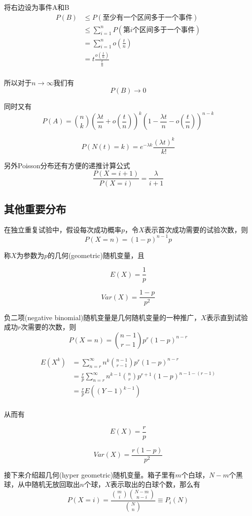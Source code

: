 \documentclass[UTF8]{ctexart}
\begin{document}
将右边设为事件A和B
$$\begin{aligned}
P(B)&\leq P(\text{至少有一个区间多于一个事件})\\
&\leq \sum_{i=1}^{n}P(\text{第}i \text{个区间多于一个事件})\\
&=\sum_{i=1}^{n}o(\frac{t}{n})\\
&=t\frac{o(\frac{t}{n})}{\frac{t}{n}}\\
\end{aligned} $$

所以对于$n\to \infty $我们有
$$P(B)\to 0$$

同时又有
$$P(A)=\binom{n}{k}(\frac{\lambda t}{n}+o(\frac{t}{n}))^{k}(1-\frac{\lambda t}{n}-o(\frac{t}{n}))^{n-k} $$

$$P(N(t)=k)=e^{-\lambda k}\frac{(\lambda t)^{k}}{k!} $$

另外Poisson分布还有方便的递推计算公式
$$\frac{P(X=i+1)}{P(X=i)}=\frac{\lambda }{i+1} $$

\subsection{其他重要分布}

在独立重复试验中，假设每次成功概率$p$，令$X$表示首次成功需要的试验次数，则
$$P(X=n)=(1-p)^{n-1}p$$

称$X$为参数为$p$的几何(geometric)随机变量，且

$$E(X)=\frac{1}{p}$$

$$Var(X)=\frac{1-p}{p^{2}}$$

负二项(negative binomial)随机变量是几何随机变量的一种推广，$X$表示直到试验成功$r$次需要的次数，则
$$P(X=n)=\binom{n-1}{r-1}p^{r}(1-p)^{n-r} $$

$$\begin{aligned}
E(X^{k})&=\sum_{n=r}^{\infty }n^{k}\binom{n-1}{r-1}p^{r}(1-p)^{n-r}\\
&=\frac{r}{p}\sum_{n=r}^{\infty }n^{k-1}\binom{n}{r}p^{r+1}(1-p)^{n-1-(r-1)}\\
&=\frac{r}{p}E((Y-1)^{k-1})\\
\end{aligned}$$

从而有

$$E(X)=\frac{r}{p}$$

$$Var(X)=\frac{r(1-p)}{p^{2}}$$

接下来介绍超几何(hyper geometric)随机变量。箱子里有$m$个白球，$N-m$个黑球，从中随机无放回取出$n$个球，$X$表示取出的白球个数，那么有
$$P(X=i)=\frac{\binom{m}{i}\binom{N-m}{n-i}}{\binom{N}{n}}\equiv P_{i}(N)$$
\end{document}
